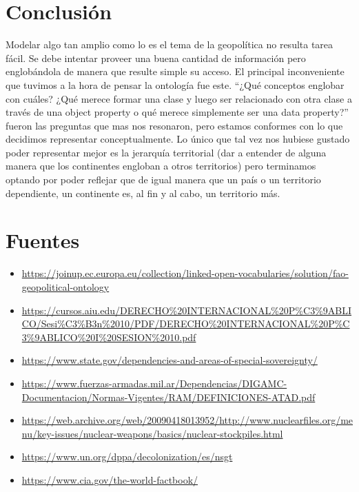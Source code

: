 \documentclass[11pt]{article}
\begin{document}
\section{Conclusión}
Modelar algo tan amplio como lo es el tema de la geopolítica no resulta tarea fácil. Se debe 
intentar proveer una buena cantidad de información pero englobándola de manera que resulte simple su acceso. 
El principal inconveniente que tuvimos a la hora de pensar la ontología fue este. ``¿Qué conceptos englobar con cuáles? 
¿Qué merece formar una clase y luego ser relacionado con otra clase a través de una object property o qué merece simplemente ser una data property?''
fueron las preguntas que mas nos resonaron, pero estamos conformes con lo que decidimos representar conceptualmente. Lo único que tal vez nos hubiese
gustado poder representar mejor es la jerarquía territorial (dar a entender de alguna manera que los continentes engloban a otros territorios) 
pero terminamos optando por poder reflejar que de igual manera que un país o un territorio dependiente, un continente es, al fin y al cabo, un territorio más.

\newpage

\section{Fuentes}

\begin{itemize}
    \item \url{https://joinup.ec.europa.eu/collection/linked-open-vocabularies/solution/fao-geopolitical-ontology}
    \item \url{https://cursos.aiu.edu/DERECHO%20INTERNACIONAL%20P%C3%9ABLICO/Sesi%C3%B3n%2010/PDF/DERECHO%20INTERNACIONAL%20P%C3%9ABLICO%20I%20SESION%2010.pdf}
    \item \url{https://www.state.gov/dependencies-and-areas-of-special-sovereignty/}
    \item \url{https://www.fuerzas-armadas.mil.ar/Dependencias/DIGAMC-Documentacion/Normas-Vigentes/RAM/DEFINICIONES-ATAD.pdf}
    \item \url{https://web.archive.org/web/20090418013952/http://www.nuclearfiles.org/menu/key-issues/nuclear-weapons/basics/nuclear-stockpiles.html}
    \item \url{https://www.un.org/dppa/decolonization/es/nsgt}
    \item \url{https://www.cia.gov/the-world-factbook/}
\end{itemize}
\end{document}

